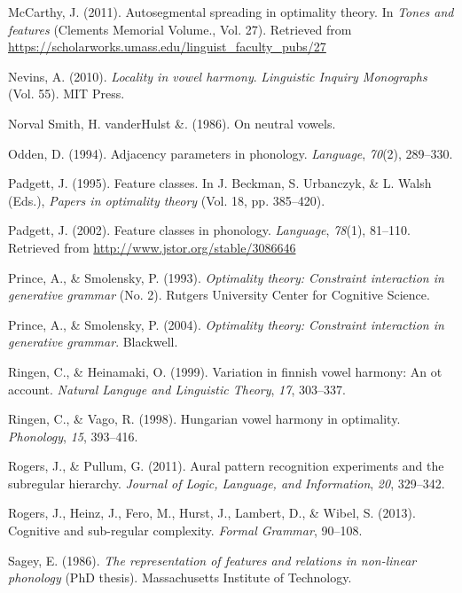 \documentclass[floatsintext,man]{apa6}
\theoremstyle{definition}
\theoremstyle{definition}
\theoremstyle{definition}
\theoremstyle{remark}
\begin{document}
\hypertarget{ref-mccarthy2011}{}
McCarthy, J. (2011). Autosegmental spreading in optimality theory. In
\emph{Tones and features} (Clements Memorial Volume., Vol. 27).
Retrieved from
\url{https://scholarworks.umass.edu/linguist_faculty_pubs/27}

\hypertarget{ref-Nevins2010}{}
Nevins, A. (2010). \emph{Locality in vowel harmony}. \emph{Linguistic
Inquiry Monographs} (Vol. 55). MIT Press.

\hypertarget{ref-vdHulstSmith1986}{}
Norval Smith, H. vanderHulst \&. (1986). On neutral vowels.

\hypertarget{ref-odden1994}{}
Odden, D. (1994). Adjacency parameters in phonology. \emph{Language},
\emph{70}(2), 289--330.

\hypertarget{ref-padgett1995}{}
Padgett, J. (1995). Feature classes. In J. Beckman, S. Urbanczyk, \& L.
Walsh (Eds.), \emph{Papers in optimality theory} (Vol. 18, pp.
385--420).

\hypertarget{ref-padgett2002}{}
Padgett, J. (2002). Feature classes in phonology. \emph{Language},
\emph{78}(1), 81--110. Retrieved from
\url{http://www.jstor.org/stable/3086646}

\hypertarget{ref-princesmolensky1993}{}
Prince, A., \& Smolensky, P. (1993). \emph{Optimality theory: Constraint
interaction in generative grammar} (No. 2). Rutgers University Center
for Cognitive Science.

\hypertarget{ref-princesmolensky2004}{}
Prince, A., \& Smolensky, P. (2004). \emph{Optimality theory: Constraint
interaction in generative grammar}. Blackwell.

\hypertarget{ref-ringenheinamaki1999}{}
Ringen, C., \& Heinamaki, O. (1999). Variation in finnish vowel harmony:
An ot account. \emph{Natural Languge and Linguistic Theory}, \emph{17},
303--337.

\hypertarget{ref-ringenvago1998}{}
Ringen, C., \& Vago, R. (1998). Hungarian vowel harmony in optimality.
\emph{Phonology}, \emph{15}, 393--416.

\hypertarget{ref-rogerspullum2011}{}
Rogers, J., \& Pullum, G. (2011). Aural pattern recognition experiments
and the subregular hierarchy. \emph{Journal of Logic, Language, and
Information}, \emph{20}, 329--342.

\hypertarget{ref-rogersetal2013}{}
Rogers, J., Heinz, J., Fero, M., Hurst, J., Lambert, D., \& Wibel, S.
(2013). Cognitive and sub-regular complexity. \emph{Formal Grammar},
90--108.

\hypertarget{ref-sagey1986}{}
Sagey, E. (1986). \emph{The representation of features and relations in
non-linear phonology} (PhD thesis). Massachusetts Institute of
Technology.
\end{document}
